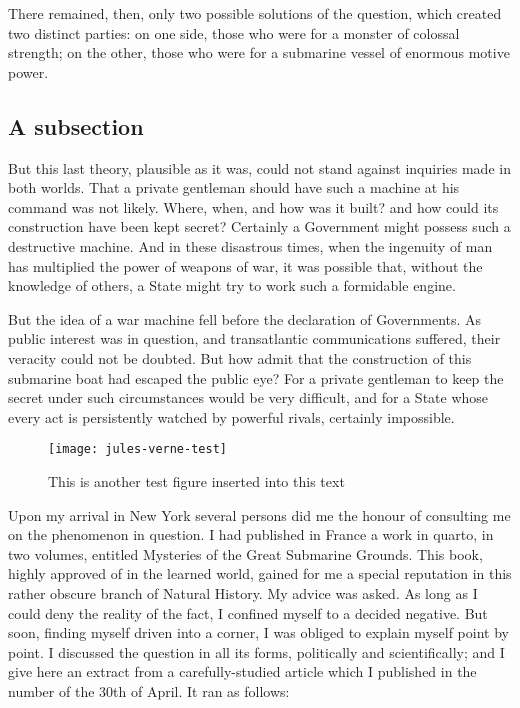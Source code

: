 There remained, then, only two possible solutions of the question,
which created two distinct parties:  on one side, those who were
for a monster of colossal strength; on the other, those who were
for a submarine vessel of enormous motive power.

\subsection{A subsection}

But this last theory, plausible as it was, could not stand against
inquiries made in both worlds.  That a private gentleman should have
such a machine at his command was not likely.  Where, when, and how
was it built? and how could its construction have been kept secret?
Certainly a Government might possess such a destructive machine.
And in these disastrous times, when the ingenuity of man has
multiplied the power of weapons of war, it was possible that,
without the knowledge of others, a State might try to work such
a formidable engine.

But the idea of a war machine fell before the declaration of Governments.
As public interest was in question, and transatlantic communications
suffered, their veracity could not be doubted.  But how admit that
the construction of this submarine boat had escaped the public eye?
For a private gentleman to keep the secret under such circumstances would
be very difficult, and for a State whose every act is persistently watched
by powerful rivals, certainly impossible.

\begin{figure}%
  \centering%
    \texttt{[image: jules-verne-test]}%
  \caption[Another test figure]%
  {This is another test figure inserted into this text
\protect\cite{misc-full}}%
  \label{fig:test2}%
\end{figure}

Upon my arrival in New York several persons did me
the honour of consulting me on the phenomenon in question.
I had published in France a work in quarto, in two volumes,
entitled Mysteries of the Great Submarine Grounds.  This book,
highly approved of in the learned world, gained for me a special
reputation in this rather obscure branch of Natural History.
My advice was asked.  As long as I could deny the reality
of the fact, I confined myself to a decided negative.
But soon, finding myself driven into a corner, I was
obliged to explain myself point by point.  I discussed
the question in all its forms, politically and scientifically;
and I give here an extract from a carefully-studied article
which I published in the number of the 30th of April.
It ran as follows:

